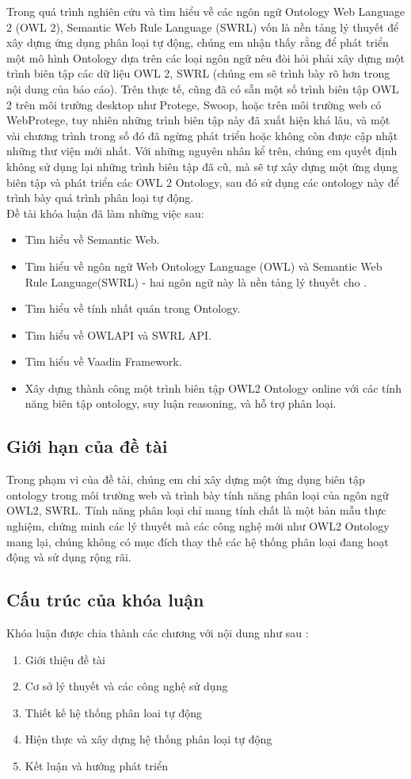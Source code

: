 Trong quá trình nghiên cứu và tìm hiểu về các ngôn ngữ Ontology Web Language 2 (OWL 2), Semantic Web Rule Language (SWRL) vốn là nền tảng lý thuyết để xây dựng ứng dụng phân loại tự động, chúng em nhận thấy rằng để phát triển một mô hình Ontology dựa trên các loại ngôn ngữ nêu đòi hỏi phải xây dựng một trình biên tập các dữ liệu OWL 2, SWRL (chúng em sẽ trình bày rõ hơn trong nội dung của báo cáo). Trên thực tế, cũng đã có sẵn một số trình biên tập OWL 2 trên môi trường desktop như Protege, Swoop, hoặc trên môi trường web có WebProtege, tuy nhiên những trình biên tập này đã xuất hiện khá lâu, và một vài chương trình trong số đó đã ngừng phát triển hoặc không còn được cập nhật những thư viện mới nhất. Với những nguyên nhân kể trên, chúng em quyết định không sử dụng lại những trình biên tập đã cũ, mà sẽ tự xây dựng một ứng dụng biên tập và phát triển các OWL 2 Ontology, sau đó sử dụng các ontology này để trình bày quá trình phân loại tự động.
\\
Đề tài khóa luận đã làm những việc sau:
\begin{itemize}
\item Tìm hiểu về Semantic Web.
\item Tìm hiểu về ngôn ngữ Web Ontology Language (OWL) và Semantic Web Rule Language(SWRL) - hai ngôn ngữ này là nền tảng lý thuyết cho .
\item Tìm hiểu về tính nhất quán trong Ontology.
\item Tìm hiểu về OWLAPI và SWRL API.
\item Tìm hiểu về Vaadin Framework.
\item Xây dựng thành công một trình biên tập OWL2 Ontology online với các tính năng biên tập ontology, suy luận reasoning, và hỗ trợ phân loại.
\end{itemize}
\subsection{Giới hạn của đề tài}
Trong phạm vi của đề tài, chúng em chỉ xây dựng một ứng dụng biên tập ontology trong môi trường web và trình bày tính năng phân loại của ngôn ngữ OWL2, SWRL. Tính năng phân loại chỉ mang tính chất là một bản mẫu thực nghiệm, chứng minh các lý thuyết mà các công nghệ mới như OWL2 Ontology mang lại, chúng không có mục đích thay thế các hệ thống phân loại đang hoạt động và sử dụng rộng rãi.
\subsection{Cấu trúc của khóa luận}
Khóa luận được chia thành các chương với nội dung như sau : 
\begin{enumerate}
\item Giới thiệu đề tài
\item Cơ sở lý thuyết và các công nghệ sử dụng
\item Thiết kế hệ thống phân loai tự động
\item Hiện thực và xây dựng hệ thống phân loại tự động
\item Kết luận và hướng phát triển
\end{enumerate}
